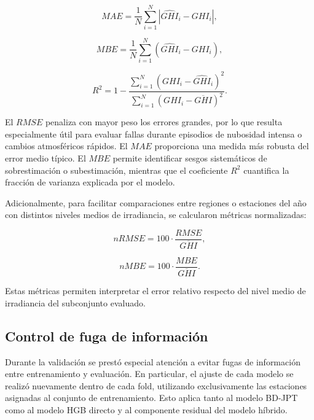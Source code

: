 \documentclass[../main.tex]{subfiles}
\begin{document}
\begin{equation}
MAE =
\frac{1}{N}
\sum_{i=1}^{N}
\left|
\hat{GHI}_i - GHI_i
\right|,
\end{equation}

\begin{equation}
MBE =
\frac{1}{N}
\sum_{i=1}^{N}
\left(
\hat{GHI}_i - GHI_i
\right),
\end{equation}

\begin{equation}
R^2 = 1 - \frac{ \sum_{i=1}^{N} \left( GHI_i - \hat{GHI}_i \right)^2 }{ \sum_{i=1}^{N} \left( GHI_i - \overline{GHI} \right)^2 }.
\end{equation}

El $RMSE$ penaliza con mayor peso los errores grandes, por lo que resulta especialmente útil para evaluar fallas durante episodios de nubosidad intensa o cambios atmosféricos rápidos. El $MAE$ proporciona una medida más robusta del error medio típico. El $MBE$ permite identificar sesgos sistemáticos de sobrestimación o subestimación, mientras que el coeficiente $R^2$ cuantifica la fracción de varianza explicada por el modelo.

Adicionalmente, para facilitar comparaciones entre regiones o estaciones del año con distintos niveles medios de irradiancia, se calcularon métricas normalizadas:

\begin{equation}
nRMSE =
100 \cdot
\frac{RMSE}{\overline{GHI}},
\end{equation}

\begin{equation}
nMBE =
100 \cdot
\frac{MBE}{\overline{GHI}}.
\end{equation}

Estas métricas permiten interpretar el error relativo respecto del nivel medio de irradiancia del subconjunto evaluado.

\subsection{Control de fuga de información}

Durante la validación se prestó especial atención a evitar fugas de información entre entrenamiento y evaluación. En particular, el ajuste de cada modelo se realizó nuevamente dentro de cada fold, utilizando exclusivamente las estaciones asignadas al conjunto de entrenamiento. Esto aplica tanto al modelo BD-JPT como al modelo HGB directo y al componente residual del modelo híbrido.
\end{document}
